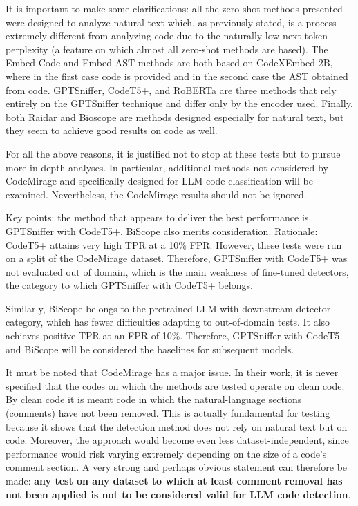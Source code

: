 It is important to make some clarifications: all the zero-shot 
methods presented were designed to analyze natural text which, 
as previously stated, is a process extremely different from 
analyzing code due to the naturally low next-token perplexity 
(a feature on which almost all zero-shot methods are based). 
The Embed-Code and Embed-AST methods are both based on 
CodeXEmbed-2B\cite{liu2024codexembed}, where in the first case code is provided and 
in the second case the AST obtained from code. GPTSniffer, 
CodeT5+, and RoBERTa are three methods that rely entirely on 
the GPTSniffer\cite{nguyen2024gptsniffer} technique and differ only by the encoder used. 
Finally, both Raidar and Bioscope are methods designed especially 
for natural text, but they seem to achieve good results on code as well.

For all the above reasons, it is justified not to stop at these tests but to pursue more in-depth analyses. In particular, additional methods not considered by CodeMirage and specifically designed for LLM code classification will be examined. Nevertheless, the CodeMirage results should not be ignored.

Key points: the method that appears to deliver the best performance 
is GPTSniffer with CodeT5+. BiScope also merits consideration. 
Rationale: CodeT5+ attains very high TPR at a 10\% 
FPR. However, these tests were run on a split of the 
CodeMirage dataset. Therefore, GPTSniffer with CodeT5+ 
was not evaluated out of domain, which is the main weakness 
of fine-tuned detectors, the category to which GPTSniffer with 
CodeT5+ belongs.

Similarly, BiScope belongs to the pretrained LLM with 
downstream detector category, which has fewer difficulties 
adapting to out-of-domain tests. It also achieves positive 
TPR at an FPR of 10\%. Therefore, GPTSniffer with 
CodeT5+ and BiScope will be considered the baselines 
for subsequent models.

It must be noted that CodeMirage has a major issue. In their work, 
it is never specified that the codes on which the methods are tested 
operate on clean code. By clean code it is meant code in which the 
natural-language sections (comments) have not been removed. 
This is actually fundamental for testing because it shows that the 
detection method does not rely on natural text but on code.
Moreover, the approach would become even less dataset-independent, 
since performance would risk varying extremely depending on the size 
of a code’s comment section.
A very strong and perhaps obvious statement can therefore be made: 
\textbf{any test on any dataset to which at least comment removal has not been 
applied is not to be considered valid for LLM code detection}.




